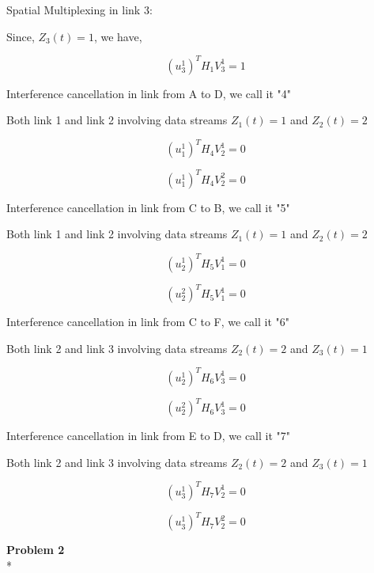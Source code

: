 \documentclass[a4paper,oneside,12pt]{report}
\begin{document}
\begin{enumerate} [(i)]
Spatial Multiplexing in link 3:

Since, $Z_3(t) = 1$, we have,

$$(u^1_3)^T H_1 V^1_3 = 1$$

Interference cancellation in link from A to D, we call it "4"

Both link 1 and link 2 involving data streams $Z_1(t) = 1$ and $Z_2(t) = 2$

$$(u^1_1)^T H_4 V^1_2 = 0$$

$$(u^1_1)^T H_4 V^2_2 = 0$$

Interference cancellation in link from C to B, we call it "5"

Both link 1 and link 2 involving data streams $Z_1(t) = 1$ and $Z_2(t) = 2$

$$(u^1_2)^T H_5 V^1_1 = 0$$

$$(u^2_2)^T H_5 V^1_1 = 0$$

Interference cancellation in link from C to F, we call it "6"

Both link 2 and link 3 involving data streams $Z_2(t) = 2$ and $Z_3(t) = 1$

$$(u^1_2)^T H_6 V^1_3 = 0$$

$$(u^2_2)^T H_6 V^1_3 = 0$$

Interference cancellation in link from E to D, we call it "7"

Both link 2 and link 3 involving data streams $Z_2(t) = 2$ and $Z_3(t) = 1$

$$(u^1_3)^T H_7 V^1_2 = 0$$

$$(u^1_3)^T H_7 V^2_2 = 0$$

\end{enumerate}

\textbf{Problem 2}	\\*
\end{document}
